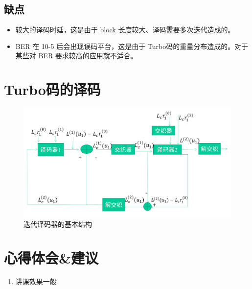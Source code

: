 \documentclass[onecolumn,oneside]{BUPTHomework}
\begin{document}
  \subsection*{缺点}

  \begin{itemize}
    \item 较大的译码时延，这是由于 block 长度较大、译码需要多次迭代造成的。
    \item BER 在 10-5 后会出现误码平台，这是由于 Turbo码的重量分布造成的。对于某些对 BER 要求较高的应用就不适合。
  \end{itemize}

  \section*{Turbo码的译码}

  \begin{figure}[!htbp]
    \centering
    \includegraphics[width = 12cm ]{image/pic1.png}
    \caption{迭代译码器的基本结构}
  \end{figure}

  \section*{心得体会\&建议}

  \begin{enumerate}
    \item 讲课效果一般
  \end{enumerate}
  
\end{document}
